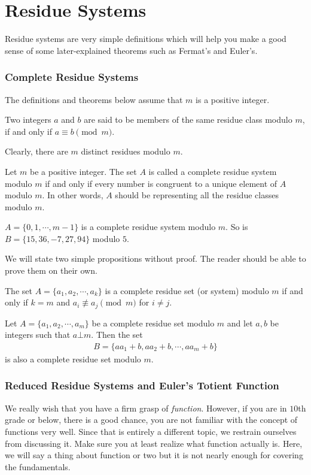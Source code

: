 \documentclass{subfile}
\begin{document}
	\section{Residue Systems}
	Residue systems are very simple definitions which will help you make a good sense of some later-explained theorems such as Fermat's and Euler's.
	\subsubsection{Complete Residue Systems}
	The definitions and theorems below assume that $m$ is a positive integer.
		\begin{definition}
			Two integers $a$ and $b$ are said to be members of the same {residue class} modulo $m$, if and only if $a \equiv b \pmod m$.
		\end{definition}
	Clearly, there are $m$ distinct residues modulo $m$.
		\begin{definition}\label{def:completeresiduesystem}
			Let $m$ be a positive integer. The set $A$ is called a {complete residue system modulo $m$} if and only if every number is congruent to a unique element of $A$ modulo $m$. In other words, $A$ should be representing all the residue classes modulo $m$.
		\end{definition}

		\begin{example}
			$A = \{0,1, \cdots, m-1\}$ is a complete residue system modulo $m$. So is $B=\{15, 36, -7, 27, 94\}$ modulo $5$.
		\end{example}
	We will state two simple propositions without proof. The reader should be able to prove them on their own.

	\begin{proposition}
		The set $A=\{a_1, a_2, \cdots, a_k\}$ is a complete residue set (or system) modulo $m$ if and only if $k=m$ and $a_i \not\equiv a_j \pmod m$ for $i \neq j$.
	\end{proposition}

	\begin{proposition} \label{prop:generalcompletesystem}
		Let $A=\{a_1, a_2, \cdots, a_m\}$ be a complete residue set modulo $m$ and let $a,b$ be integers such that $a \bot m$. Then the set
		\begin{align*}
			B=\{aa_1+b, aa_2+b, \cdots, aa_m+b\}
		\end{align*}
		is also a complete residue set modulo $m$.
	\end{proposition}

	\subsubsection{Reduced Residue Systems and Euler's Totient Function}
	We really wish that you have a firm grasp of \textit{function}. However, if you are in $10$th grade or below, there is a good chance, you are not familiar with the concept of functions very well. Since that is entirely a different topic, we restrain ourselves from discussing it. Make sure you at least realize what function actually is. Here, we will say a thing about function or two but it is not nearly enough for covering the fundamentals.
\end{document}
